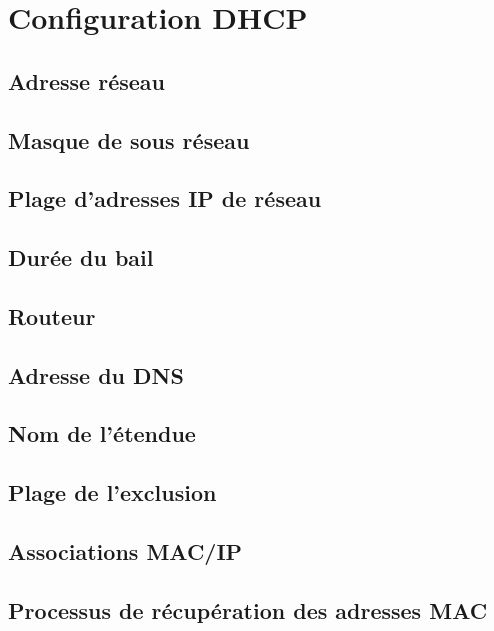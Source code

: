 \section{Configuration DHCP}

\subsection{Adresse réseau}

\subsection{Masque de sous réseau}

\subsection{Plage d'adresses IP de réseau}

\subsection{Durée du bail}

\subsection{Routeur}

\subsection{Adresse du DNS}

\subsection{Nom de l'étendue}

\subsection{Plage de l'exclusion}

\subsection{Associations MAC/IP}

\subsection{Processus de récupération des adresses MAC}
